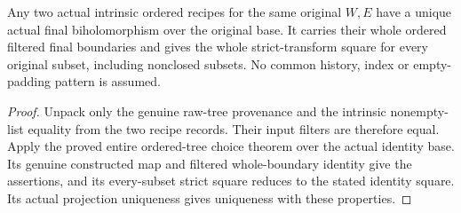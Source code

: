 \begin{theorem}
\label{hir:original-intrinsic-ordered-recipe-choice}
\leanok
Any two actual intrinsic ordered recipes for the same original $W,E$
have a unique actual final biholomorphism over the original base.
It carries their whole ordered filtered final boundaries and gives the
whole strict-transform square for every original subset, including
nonclosed subsets. No common history, index or empty-padding pattern
is assumed.
\end{theorem}
\begin{proof}
Unpack only the genuine raw-tree provenance and the intrinsic
nonempty-list equality from the two recipe records. Their input
filters are therefore equal. Apply the proved entire ordered-tree
choice theorem over the actual identity base. Its genuine constructed
map and filtered whole-boundary identity give the assertions, and
its every-subset strict square reduces to the stated identity square.
Its actual projection uniqueness gives uniqueness with these properties.
\end{proof}

